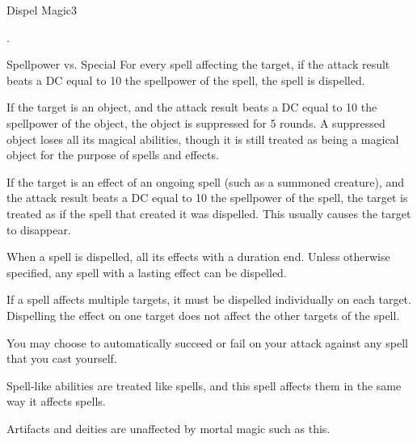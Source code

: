 \begin{spellsection}{Dispel Magic}{3}
    \begin{spellheader}
        .
    \end{spellheader}
    \begin{spellcontent}
        \begin{spelltargetinginfo}
        \end{spelltargetinginfo}
        \begin{spelleffects}
            \begin{spellattack}{Spellpower vs. Special}
                \spelleffect For every spell affecting the target, if the attack result beats a DC equal to 10 \add the spellpower of the spell, the spell is dispelled.

                If the target is an object, and the attack result beats a DC equal to 10 \add the spellpower of the object, the object is suppressed for 5 rounds. A suppressed object loses all its magical abilities, though it is still treated as being a magical object for the purpose of spells and effects.

                If the target is an effect of an ongoing spell (such as a summoned creature), and the attack result beats a DC equal to 10 \add the spellpower of the spell, the target is treated as if the spell that created it was dispelled. This usually causes the target to disappear.
            \end{spellattack}
        \end{spelleffects}
    \end{spellcontent}
    \begin{spellfooter}
        \spellnotes When a spell is dispelled, all its effects with a duration end. Unless otherwise specified, any spell with a lasting effect can be dispelled.

        If a spell affects multiple targets, it must be dispelled individually on each target. Dispelling the effect on one target does not affect the other targets of the spell.

        You may choose to automatically succeed or fail on your attack against any spell that you cast yourself.

        Spell-like abilities are treated like spells, and this spell affects them in the same way it affects spells.

        Artifacts and deities are unaffected by mortal magic such as this.
        \miscastrandom
    \end{spellfooter}
\end{spellsection}

